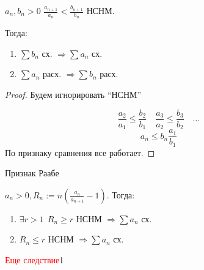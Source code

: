 \begin{lemma}
    $a_n, b_n > 0$ $\frac{a_{n+1}}{a_n} < \frac{b_{n+1}}{b_n}$ НСНМ.

    Тогда:
    \begin{enumerate}
        \item $\sum b_n$ сх. $\Rightarrow \sum a_n$ сх.
        \item $\sum a_n$ расх. $\Rightarrow \sum b_n$ расх.
    \end{enumerate}
\end{lemma}
\begin{proof}
    Будем игнорировать ``НСНМ''

    $$\frac{a_2}{a_1}\leq\frac{b_2}{b_1} \quad \frac{a_3}{a_2} \leq \frac{b_3}{b_2} \quad \ldots$$
    $$a_n\leq b_n \frac{a_1}{b_1}$$
    По признаку сравнения все работает.
\end{proof}

\begin{theorem}
    Признак Раабе

    $a_n > 0, R_n:=n\left( \frac{a_n}{a_{n+1}} - 1 \right)$. Тогда:
    \begin{enumerate}
        \item $\exists r > 1 \ \ R_n\geq r$ НСНМ $\Rightarrow \sum a_n$ сх.
        \item $R_n\leq r$ НСНМ $\Rightarrow \sum a_n$ сх.
    \end{enumerate}
\end{theorem}

\textcolor{red}{Еще следствие}1

